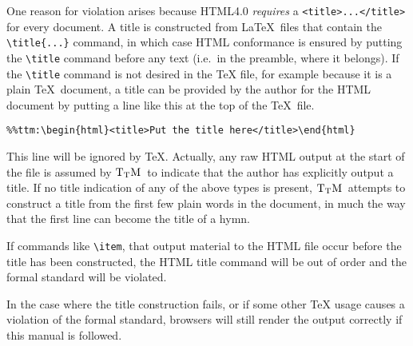 \documentclass[12pt]{article}
\def\TtM{$\rm{}T_TH$}
\def\TtM{$\rm{}T_TM$}%
\begin{document}
One reason for violation
arises because HTML4.0 {\it requires} a
\verb+<title>...</title>+ for every document.
A title is constructed from \LaTeX\ files that contain the \verb+\title{...}+
command, in which case HTML conformance is ensured by putting the
\verb+\title+ command before any text (i.e.~in the preamble, where it
belongs).  If the \verb+\title+ command is not desired in the \TeX
file, for example because it is a plain \TeX\ document,
a title can be provided by the author for the HTML document by putting
a line like this at the top of the \TeX\ file.
\begin{verbatim}
%%ttm:\begin{html}<title>Put the title here</title>\end{html}
\end{verbatim}
This line will be ignored by \TeX. Actually, any raw HTML output at the
start of the file is assumed by \TtM\ to indicate that the author has
explicitly output a title. If no title indication of any of the above
types is present, \TtM\ attempts to construct a title from the first few
plain words in the document, in much the way that the first line can
become the title of a hymn.  

If commands like
\verb|\item|, that output material to the HTML file occur
before the title has been constructed, the HTML title command will be
out of order and the formal standard will be violated. 

In the case where the title construction fails, or if some other \TeX
usage causes a violation of the formal standard, browsers will
still render the output correctly if this manual is followed.
\end{document}
